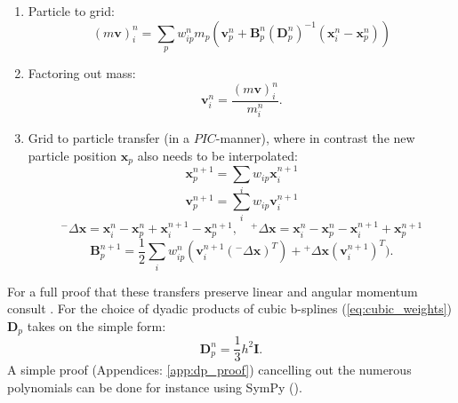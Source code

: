 \documentclass[m,times]{cgMA}
\begin{document}
\begin{enumerate}
  \item Particle to grid:
    \begin{equation}\label{eq:apic_mom_p2g}
    (m\boldsymbol{v})^n_i = \sum_p w^n_{ip}m_p (\boldsymbol { v } _ { p } ^ { n } + \boldsymbol { B } _ { p } ^ { n } ( \boldsymbol { D } _ { p } ^ { n } ) ^ { - 1 } ( \boldsymbol { x } _ { i } ^ { n } - \boldsymbol { x } _ { p } ^ { n } ) )
\end{equation}
  \item Factoring out mass:
    \begin{equation}
      \boldsymbol{v}_i^n = \frac{(m\boldsymbol{v})_i^n}{m_i^n}.
    \end{equation}
  \item Grid to particle transfer (in a $PIC$-manner), where in contrast the new particle position $\boldsymbol{x}_p$ also needs to be interpolated:
    \begin{equation}
      \boldsymbol{x}_{p}^{n+1} = \sum_i w_{ip}\boldsymbol{x}_i^{n+1}
    \end{equation}
    \begin{equation}
      \boldsymbol{v}_{p}^{n+1} = \sum_i w_{ip}\boldsymbol{v}_i^{n+1}
    \end{equation}
    $$
    {^-}\Delta \boldsymbol{x} = \boldsymbol { x } _ { i } ^ { n } - \boldsymbol { x } _ { p } ^ { n } +   \boldsymbol { x }_ { i } ^ { n + 1 } - \boldsymbol { x } _ { p } ^ { n + 1 },
    \quad {^+}\Delta \boldsymbol{x} = \boldsymbol { x } _ { i } ^ { n } - \boldsymbol { x } _ { p } ^ { n } -  { \boldsymbol { x } } _ { i } ^ { n + 1 } + \boldsymbol { x } _ { p } ^ { n + 1 }
    $$
\begin{equation}\label{eq:apic_mom_g2p}
  \boldsymbol { B } _ { p } ^ { n + 1 } = \frac { 1 } { 2 } \sum _ { i } w _ { i p } ^ { n } (\boldsymbol { v }_ { i } ^ { n + 1 } ({^-}\Delta \boldsymbol{x}) ^ { T }) {+}  {^+}\Delta \boldsymbol{x} ( { \boldsymbol { v } } _ { i } ^ { n + 1 } ) ^ { T }).
\end{equation}

\end{enumerate}
For a full proof that these transfers preserve linear and angular momentum consult \cite{MPM:APIC}. For the choice of dyadic products of cubic b-splines (\ref{eq:cubic_weights}) $\boldsymbol{D}_p$ takes on the simple form:
\begin{equation}
\boldsymbol{D}_p^n = \frac { 1 } { 3 } h ^ { 2 } \boldsymbol { I }.
\end{equation}
A simple proof (Appendices: \ref{app:dp_proof}) cancelling out the numerous polynomials can be done for instance using SymPy (\cite{Sympy}).\cite{MPM:APIC}\cite{MPM:OLD_APIC}
\end{document}
